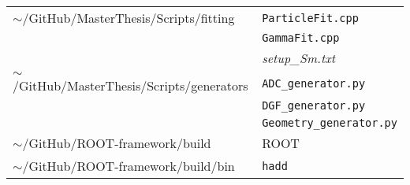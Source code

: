 \begin{tabular}{ll}
    $\sim$/GitHub/MasterThesis/Scripts/fitting             & \texttt{ParticleFit.cpp}                \\
                                                           & \texttt{GammaFit.cpp}                   \\
                                                           & \textit{setup\_Sm.txt}                  \\
    $\sim$/GitHub/MasterThesis/Scripts/generators          & \texttt{ADC\_generator.py}              \\
                                                           & \texttt{DGF\_generator.py}              \\
                                                           & \texttt{Geometry\_generator.py}         \\
    $\sim$/GitHub/ROOT-framework/build                     & ROOT                                    \\
    $\sim$/GitHub/ROOT-framework/build/bin                 & \texttt{hadd}                           \\
    \hline
\end{tabular}